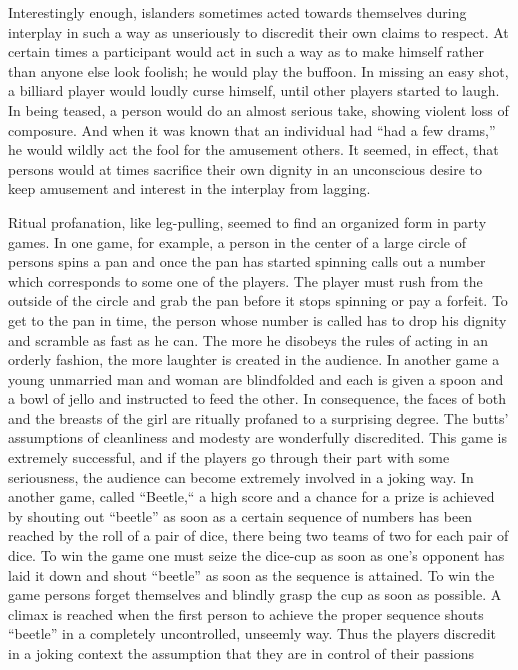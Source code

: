 \documentclass[openany,nobib]{tufte-book}
\begin{document}
Interestingly enough, islanders sometimes acted towards themselves
during interplay in such a way as unseriously to discredit their own
claims to respect. At certain times a participant would act in such a
way as to make himself rather than anyone else look foolish; he would
play the buffoon. In missing an easy shot, a billiard player would
loudly curse himself, until other players started to laugh. In being
teased, a person would do an almost serious take, showing violent loss
of composure. And when it was known that an individual had ``had a few
drams,'' he would wildly act the fool for the amusement others. It
seemed, in effect, that persons would at times sacrifice their own
dignity in an unconscious desire to keep amusement and interest in the
interplay from lagging.

Ritual profanation, like leg-pulling, seemed to find an organized form
in party games. In one game, for example, a person in the center of a
large circle of persons spins a pan and once the pan has started
spinning calls out a number which corresponds to some one of the
players. The player must rush from the outside of the circle and grab
the pan before it stops spinning or pay a forfeit. To get to the pan in
time, the person whose number is called has to drop his dignity and
scramble as fast as he can. The more he disobeys the rules of acting in
an orderly fashion, the more laughter is created in the audience. In
another game a young unmarried man and woman are blindfolded and each is
given a spoon and a bowl of jello and instructed to feed the other. In
consequence, the faces of both and the breasts of the girl are ritually
profaned to a surprising degree. The butts' assumptions of cleanliness
and modesty are wonderfully discredited. This game is extremely
successful, and if the players go through their part with some
seriousness, the audience can become extremely involved in a joking way.
In another game, called ``Beetle,`` a high score and a chance for a
prize is achieved by shouting out ``beetle'' as soon as a certain
sequence of numbers has been reached by the roll of a pair of dice,
there being two teams of two for each pair of dice. To win the game one
must seize the dice-cup as soon as one's opponent has laid it down and
shout ``beetle'' as soon as the sequence is attained. To win the game
persons forget themselves and blindly grasp the cup as soon as possible.
A climax is reached when the first person to achieve the proper sequence
shouts ``beetle'' in a completely uncontrolled, unseemly way. Thus the
players discredit in a joking context the assumption that they are in
control of their passions
\end{document}
